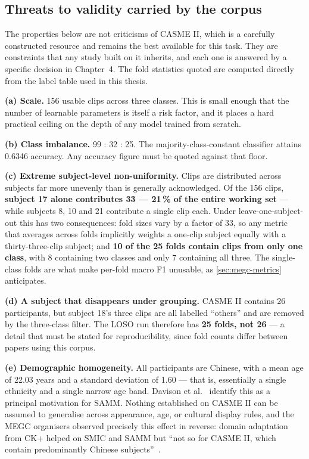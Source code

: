 \subsection{Threats to validity carried by the corpus}
\label{sec:corpus-threats}

The properties below are not criticisms of CASME II, which is a carefully constructed resource and remains the best available for this task. They are constraints that any study built on it inherits, and each one is answered by a specific decision in Chapter~4. The fold statistics quoted are computed directly from the label table used in this thesis.

\textbf{(a) Scale.} 156 usable clips across three classes. This is small enough that the number of learnable parameters is itself a risk factor, and it places a hard practical ceiling on the depth of any model trained from scratch.

\textbf{(b) Class imbalance.} 99 : 32 : 25. The majority-class-constant classifier attains 0.6346 accuracy. Any accuracy figure must be quoted against that floor.

\textbf{(c) Extreme subject-level non-uniformity.} Clips are distributed across subjects far more unevenly than is generally acknowledged. Of the 156 clips, \textbf{subject 17 alone contributes 33 --- 21\,\% of the entire working set} --- while subjects 8, 10 and 21 contribute a single clip each. Under leave-one-subject-out this has two consequences: fold sizes vary by a factor of 33, so any metric that averages across folds implicitly weights a one-clip subject equally with a thirty-three-clip subject; and \textbf{10 of the 25 folds contain clips from only one class}, with 8 containing two classes and only 7 containing all three. The single-class folds are what make per-fold macro F1 unusable, as \autoref{sec:megc-metrics} anticipates.

\textbf{(d) A subject that disappears under grouping.} CASME II contains 26 participants, but subject 18's three clips are all labelled ``others'' and are removed by the three-class filter. The LOSO run therefore has \textbf{25 folds, not 26} --- a detail that must be stated for reproducibility, since fold counts differ between papers using this corpus.

\textbf{(e) Demographic homogeneity.} All participants are Chinese, with a mean age of 22.03 years and a standard deviation of 1.60 --- that is, essentially a single ethnicity and a single narrow age band. Davison et al.~\cite{davison2018} identify this as a principal motivation for SAMM. Nothing established on CASME II can be assumed to generalise across appearance, age, or cultural display rules, and the MEGC organisers observed precisely this effect in reverse: domain adaptation from CK+ helped on SMIC and SAMM but ``not so for CASME II, which contain predominantly Chinese subjects''~\cite{see2019}.


